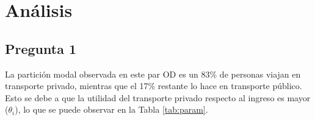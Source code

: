\section{Análisis}

\subsection{Pregunta 1}

La partición modal observada en este par OD es un 83\% de personas viajan en transporte privado, mientras que el 17\% restante lo hace en transporte público. Esto se debe a que la utilidad del transporte privado respecto al ingreso es mayor ($\theta_{i}$), lo que se puede observar en la Tabla \ref{tab:param}.